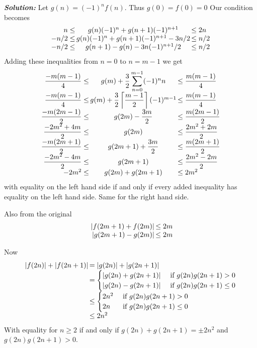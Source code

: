 \documentclass[12pt]{article}
\newcommand{\sol}{\textbf{\textit{Solution: }}}
\begin{document}
\begin{enumerate}[topsep=\bigskipamount,itemsep=\bigskipamount,leftmargin=0pt]
\sol
Let $g(n) = (-1)^n f(n)$.
Thus $g(0) = f(0) = 0$
Our condition becomes
$$\begin{array}{r@{\,}c@{\,}l}
  n\leq & g(n)(-1)^n + g(n+1)(-1)^{n+1} & \leq 2n \\
  -n/2\leq & g(n)(-1)^n + g(n+1)(-1)^{n+1} -3n/2 & \leq n/2 \\
  -n/2\leq & g(n+1) - g(n) -3n(-1)^{n+1}/2 & \leq n/2
\end{array}$$
Adding these inequalities
from $n=0$ to $n=m-1$
we get
$$\begin{array}{r@{\,}c@{\,}l}
\dfrac{-m(m-1)}{4}\leq & g(m) + {\displaystyle\frac{3}{2}\sum_{n=0}^{m-1}} (-1)^n n & \leq \dfrac{m(m-1)}{4}\\
\dfrac{-m(m-1)}{4}\leq & g(m) + \dfrac{3}{2}\left\lceil\dfrac{m-1}{2}\right\rceil(-1)^{m-1} & \leq \dfrac{m(m-1)}{4}\\
\dfrac{-m(2m-1)}{2}\leq & g(2m) - \dfrac{3m}{2} & \leq \dfrac{m(2m-1)}{2}\\
\dfrac{-2m^2+4m}{2}\leq & g(2m)& \leq \dfrac{2m^2+2m}{2}\\
\dfrac{-m(2m+1)}{2}\leq & g(2m+1) + \dfrac{3m}{2} & \leq \dfrac{m(2m+1)}{2}\\
\dfrac{-2m^2-4m}{2}\leq & g(2m+1)& \leq \dfrac{2m^2-2m}{2}\\
-2m^2 \leq & g(2m) + g(2m+1) & \leq 2m^2
\end{array}$$
with equality on the left hand side if and only if every added inequality has equality on the left hand side.
Same for the right hand side.

Also from the original
$$\begin{array}{r@{\,}c@{\,}l}
  |f(2m+1) + f(2m)| & \leq 2m\\
  |g(2m+1) - g(2m)| & \leq 2m
\end{array}$$

Now 
$$\begin{array}{r@{\,}l}
  |f(2n)|+|f(2n+1)| & = |g(2n)|+|g(2n+1)|\\
  & =\begin{cases}
    |g(2n)+g(2n+1)| & \text{ if } g(2n)g(2n+1) > 0\\
    |g(2n)-g(2n+1)| & \text{ if } g(2n)g(2n+1) \leq 0
  \end{cases}\\
  & \leq \begin{cases}
    2n^2 & \text{ if } g(2n)g(2n+1) > 0\\
    2n & \text{ if } g(2n)g(2n+1) \leq 0
  \end{cases}\\
  & \leq 2n^2
\end{array}$$
With equality for $n\geq 2$ if and only if $g(2n)+g(2n+1)=\pm 2n^2$ and $g(2n)g(2n+1) > 0$.


\end{enumerate}
\end{document}
